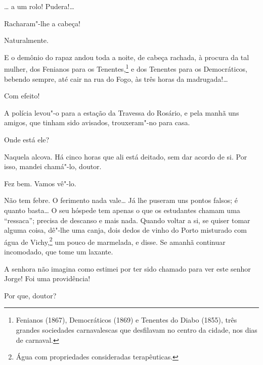 \begin{linenumbers}
 \ldots{} a um rolo! Pudera!\ldots{}

 Racharam"-lhe a cabeça!

 Naturalmente.

 E o demônio do rapaz andou toda a noite, de cabeça
rachada, à procura da tal mulher, dos Fenianos para os Tenentes,\footnote{
Fenianos (1867), Democráticos (1869) e Tenentes do Diabo (1855), três grandes
sociedades carnavalescas que desfilavam no centro da cidade, nos dias de
carnaval.} e dos
Tenentes para os Democráticos, bebendo sempre, até cair na rua do Fogo,
às três horas da madrugada!\ldots{}

 Com efeito!

 A polícia levou"-o para a estação da Travessa do Rosário, e
pela manhã uns amigos, que tinham sido avisados, trouxeram"-no para
casa.

 Onde está ele?

 Naquela alcova. Há cinco horas que ali está deitado, sem
dar acordo de si. Por isso, mandei chamá"-lo, doutor.

 Fez bem. Vamos vê"-lo. 



  Não tem febre.
 O ferimento nada vale\ldots{} Já
lhe puseram uns pontos falsos; é quanto basta\ldots{} O seu hóspede tem
apenas o que os estudantes chamam uma “ressaca”; precisa de descanso e
mais nada. Quando voltar a si, se quiser tomar alguma coisa, dê"-lhe uma
canja, dois dedos de vinho do Porto misturado com água de
Vichy,\footnote{ Água com propriedades consideradas terapêuticas.} 
um pouco de marmelada, e disse. Se amanhã continuar
incomodado, que tome um laxante.



  A senhora não imagina como
estimei por ter sido chamado para ver este senhor Jorge! Foi uma
providência!

 Por que, doutor?


\end{linenumbers}
